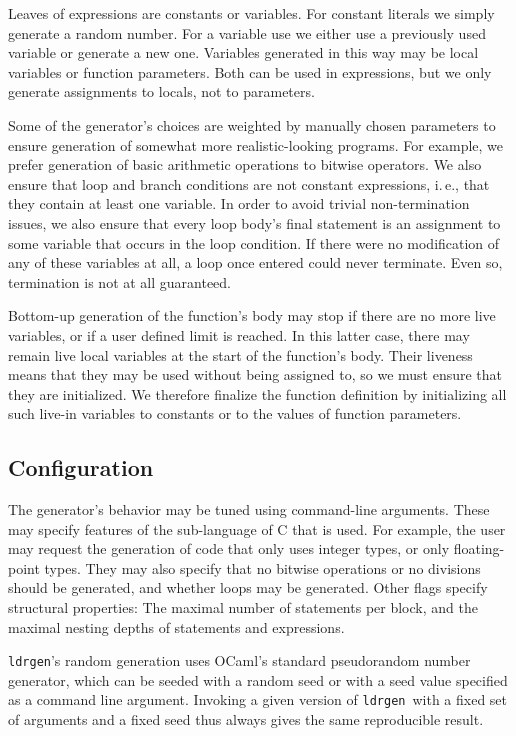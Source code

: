\documentclass{llncs}
\newcommand\ldrgen{\texttt{ldrgen}}
\begin{document}
Leaves of expressions are constants or variables. For constant literals we
simply generate a random number. For a variable use we either use a
previously used variable or generate a new one. Variables generated in
this way may be local variables or function parameters. Both can be used in
expressions, but we only generate assignments to locals, not to parameters.

Some of the generator's choices are weighted by manually chosen parameters
to ensure generation of somewhat more realistic-looking programs. For
example, we prefer generation of basic arithmetic operations to bitwise
operators. We also ensure that loop and branch conditions are not constant
expressions, i.\,e., that they contain at least one variable. In order to
avoid trivial non-termination issues, we also ensure that every loop body's
final statement is an assignment to some variable that occurs in the loop
condition. If there were no modification of any of these variables at all, a
loop once entered could never terminate. Even so, termination is not at all
guaranteed.

Bottom-up generation of the function's body may stop if there are no more
live variables, or if a user defined limit is reached. In this
latter case, there may remain live local variables at the start of the
function's body. Their liveness means that they may be used without being
assigned to, so we must ensure that they are initialized. We therefore
finalize the function definition by initializing all such live-in variables
to constants or to the values of function parameters.

\subsection{Configuration}

The generator's behavior may be tuned using command-line arguments. These
may specify features of the sub-language of C that is used. For example, the
user may request the generation of code that only uses integer types, or
only floating-point types. They may also specify that no bitwise operations
or no divisions should be generated, and whether loops may be generated.
Other flags specify structural properties: The maximal number of statements
per block, and the maximal nesting depths of statements and expressions.

\ldrgen's random generation uses OCaml's standard pseudorandom number
generator, which can be seeded with a random seed or with a seed value
specified as a command line argument. Invoking a given version of \ldrgen\
with a fixed set of arguments and a fixed seed thus always gives the same
reproducible result.
\end{document}
